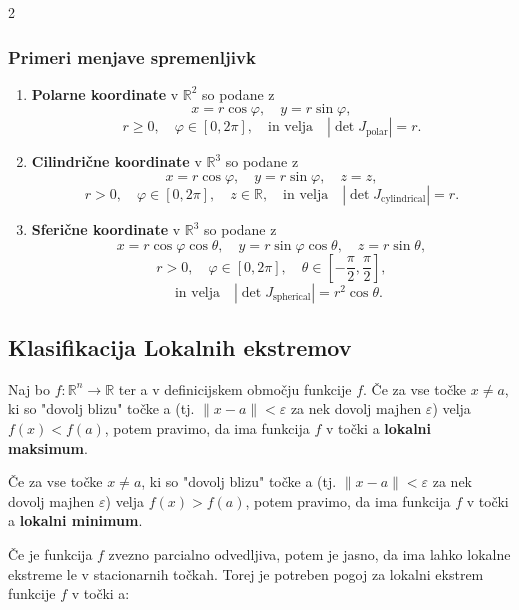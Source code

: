 \documentclass{article}
\begin{document}
\begin{multicols}{2}
	\subsubsection{Primeri menjave spremenljivk}

	\begin{enumerate}
		\item \textbf{Polarne koordinate} v \( \mathbb{R}^2 \) so podane z
		      \[
			      x = r \cos \varphi, \quad y = r \sin \varphi,
		      \]
		      \[
			      r \geq 0, \quad \varphi \in [0, 2\pi], \quad \text{in velja} \quad |\det J_{\text{polar}}| = r.
		      \]

		\item \textbf{Cilindrične koordinate} v \( \mathbb{R}^3 \) so podane z
		      \[
			      x = r \cos \varphi, \quad y = r \sin \varphi, \quad z = z,
		      \]
		      \[
			      r > 0, \quad \varphi \in [0, 2\pi], \quad z \in \mathbb{R}, \quad \text{in velja} \quad |\det J_{\text{cylindrical}}| = r.
		      \]

		\item \textbf{Sferične koordinate} v \( \mathbb{R}^3 \) so podane z
		      \[
			      x = r \cos \varphi \cos \theta, \quad y = r \sin \varphi \cos \theta, \quad z = r \sin \theta,
		      \]
		      \[
			      r > 0, \quad \varphi \in [0, 2\pi], \quad \theta \in \left[-\frac{\pi}{2}, \frac{\pi}{2}\right],
		      \]
		      \[
			      \quad \text{in velja} \quad |\det J_{\text{spherical}}| = r^2 \cos \theta.
		      \]
	\end{enumerate}

	\subsection{Klasifikacija Lokalnih ekstremov}

	Naj bo \( f: \mathbb{R}^n \rightarrow \mathbb{R} \) ter a v definicijskem območju funkcije \( f \).
	Če za vse točke \( x \neq a \), ki so "dovolj blizu" točke a (tj. \( \| x - a \| < \varepsilon \) za nek dovolj majhen \( \varepsilon \)) velja \( f(x) < f(a) \),
	potem pravimo, da ima funkcija \( f \) v točki a \textbf{lokalni maksimum}.

	Če za vse točke \( x \neq a \), ki so "dovolj blizu" točke a (tj. \( \| x - a \| < \varepsilon \) za nek dovolj majhen \( \varepsilon \)) velja \( f(x) > f(a) \),
	potem pravimo, da ima funkcija \( f \) v točki a \textbf{lokalni minimum}.

	Če je funkcija \( f \) zvezno parcialno odvedljiva, potem je jasno, da ima lahko lokalne ekstreme le v stacionarnih točkah. Torej je potreben pogoj za lokalni ekstrem funkcije \( f \) v točki a:


\end{multicols}
\end{document}
